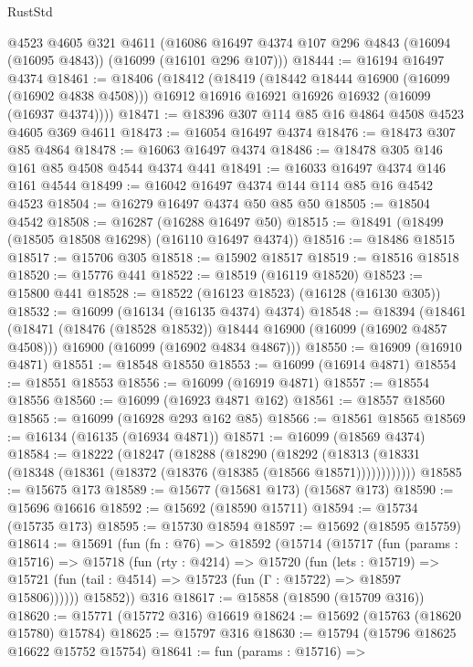 \begin{lexlean}{RustStd}
\begin{coremodule}
    @4523
    @4605
    @321
    @4611
    (@16086 @16497 @4374 @107 @296 @4843 (@16094 (@16095 @4843)) (@16099 (@16101 @296 @107)))
@18444 := @16194 @16497 @4374
@18461 := @18406
    (@18412
      (@18419
        (@18442 @18444 @16900 (@16099 (@16902 @4838 @4508)))
        @16912
        @16916
        @16921
        @16926
        @16932
        (@16099 (@16937 @4374))))
@18471 := @18396 @307 @114 @85 @16 @4864 @4508 @4523 @4605 @369 @4611
@18473 := @16054 @16497 @4374
@18476 := @18473 @307 @85 @4864
@18478 := @16063 @16497 @4374
@18486 := @18478 @305 @146 @161 @85 @4508 @4544 @4374 @441
@18491 := @16033 @16497 @4374 @146 @161 @4544
@18499 := @16042 @16497 @4374 @144 @114 @85 @16 @4542 @4523
@18504 := @16279 @16497 @4374 @50 @85 @50
@18505 := @18504 @4542
@18508 := @16287 (@16288 @16497 @50)
@18515 := @18491 (@18499 (@18505 @18508 @16298) (@16110 @16497 @4374))
@18516 := @18486 @18515
@18517 := @15706 @305
@18518 := @15902 @18517
@18519 := @18516 @18518
@18520 := @15776 @441
@18522 := @18519 (@16119 @18520)
@18523 := @15800 @441
@18528 := @18522 (@16123 @18523) (@16128 (@16130 @305))
@18532 := @16099 (@16134 (@16135 @4374) @4374)
@18548 := @18394
    (@18461
      (@18471 (@18476 (@18528 @18532)) @18444 @16900 (@16099 (@16902 @4857 @4508)))
      @16900
      (@16099 (@16902 @4834 @4867)))
@18550 := @16909 (@16910 @4871)
@18551 := @18548 @18550
@18553 := @16099 (@16914 @4871)
@18554 := @18551 @18553
@18556 := @16099 (@16919 @4871)
@18557 := @18554 @18556
@18560 := @16099 (@16923 @4871 @162)
@18561 := @18557 @18560
@18565 := @16099 (@16928 @293 @162 @85)
@18566 := @18561 @18565
@18569 := @16134 (@16135 (@16934 @4871))
@18571 := @16099 (@18569 @4374)
@18584 := @18222
    (@18247
      (@18288
        (@18290
          (@18292 (@18313 (@18331 (@18348 (@18361 (@18372 (@18376 (@18385 (@18566 @18571))))))))))))
@18585 := @15675 @173
@18589 := @15677 (@15681 @173) (@15687 @173)
@18590 := @15696 @16616
@18592 := @15692 (@18590 @15711)
@18594 := @15734 (@15735 @173)
@18595 := @15730 @18594
@18597 := @15692 (@18595 @15759)
@18614 := @15691
    (fun (fn : @76) =>
    @18592
      (@15714
        (@15717
          (fun (params : @15716) =>
          @15718
            (fun (rty : @4214) =>
            @15720
              (fun (lets : @15719) =>
              @15721 (fun (tail : @4514) => @15723 (fun (Γ : @15722) => @18597 @15806))))))
        @15852))
    @316
@18617 := @15858 (@18590 (@15709 @316))
@18620 := @15771 (@15772 @316) @16619
@18624 := @15692 (@15763 (@18620 @15780) @15784)
@18625 := @15797 @316
@18630 := @15794 (@15796 @18625 @16622 @15752 @15754)
@18641 := fun (params : @15716) =>

\end{coremodule}
\end{lexlean}
